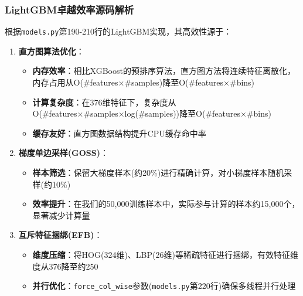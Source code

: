 \documentclass[UTF8]{report}
\theoremstyle{MyLineTheoremStyle} %
\theoremstyle{MyBlockTheoremStyle} %
\theoremstyle{MySubsubsectionStyle} %
\begin{document}
\subsubsection{LightGBM卓越效率源码解析}
根据\texttt{models.py}第190-210行的LightGBM实现，其高效性源于：
\begin{enumerate}
    \item \textbf{直方图算法优化}：
    \begin{itemize}
        \item \textbf{内存效率}：相比XGBoost的预排序算法，直方图方法将连续特征离散化，内存占用从O(\#features×\#samples)降至O(\#features×\#bins)
        \item \textbf{计算复杂度}：在376维特征下，复杂度从O(\#features×\#samples×log(\#samples))降至O(\#features×\#bins)
        \item \textbf{缓存友好}：直方图数据结构提升CPU缓存命中率
    \end{itemize}
    \item \textbf{梯度单边采样(GOSS)}：
    \begin{itemize}
        \item \textbf{样本筛选}：保留大梯度样本(约20\%)进行精确计算，对小梯度样本随机采样(约10\%)
        \item \textbf{效率提升}：在我们的50,000训练样本中，实际参与计算的样本约15,000个，显著减少计算量
    \end{itemize}
    \item \textbf{互斥特征捆绑(EFB)}：
    \begin{itemize}
        \item \textbf{维度压缩}：将HOG(324维)、LBP(26维)等稀疏特征进行捆绑，有效特征维度从376降至约250
        \item \textbf{并行优化}：\texttt{force\_col\_wise}参数(\texttt{models.py}第220行)确保多线程并行处理
    \end{itemize}
\end{enumerate}
\end{document}
